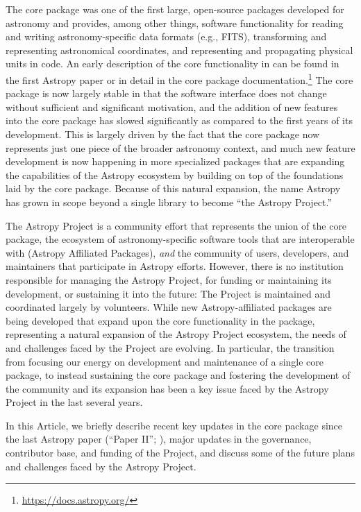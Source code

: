 \documentclass[modern]{aastex631}
\begin{document}
The \astropypkg core package was one of the first large, open-source \python
packages developed for astronomy and provides, among other things, software
functionality for reading and writing astronomy-specific data formats (e.g.,
FITS), transforming and representing astronomical coordinates, and representing
and propagating physical units in code.
An early description of the core functionality in \astropypkg can be found in
the first Astropy paper \citep{astropy:2013} or in detail in the core package
documentation.\footnote{\url{https://docs.astropy.org/}}
The \astropypkg core package is now largely stable in that the software
interface does not change without sufficient and significant motivation, and the
addition of new features into the core package has slowed significantly as
compared to the first years of its development.
This is largely driven by the fact that the core package now represents just one
piece of the broader astronomy \python context, and much new feature development
is now happening in more specialized packages that are expanding the
capabilities of the Astropy ecosystem by building on top of the foundations laid
by the \astropypkg core package.
Because of this natural expansion, the name Astropy has grown in scope beyond a
single \python library to become ``the Astropy Project.''

The Astropy Project is a community effort that represents the union of the
\astropypkg core package, the ecosystem of astronomy-specific software tools
that are interoperable with \astropypkg (Astropy Affiliated Packages),
\emph{and} the community of users, developers, and maintainers that participate
in Astropy efforts.
However, there is no institution responsible for managing the Astropy Project,
for funding or maintaining its development, or sustaining it into the future:
The Project is maintained and coordinated largely by volunteers.
While new Astropy-affiliated packages are being developed that expand upon the
core functionality in the \astropypkg package, representing a natural expansion
of the Astropy Project ecosystem, the needs of and challenges faced by the
Project are evolving.
In particular, the transition from focusing our energy on development and
maintenance of a single core package, to instead sustaining the core package and
fostering the development of the community and its expansion has been a key
issue faced by the Astropy Project in the last several years.

In this Article, we briefly describe recent key updates in the \astropypkg core
package since the last Astropy paper (``Paper II''; \citealt{astropy:2018}),
major updates in the governance, contributor base, and funding of the Project,
and discuss some of the future plans and challenges faced by the Astropy
Project.
\end{document}
